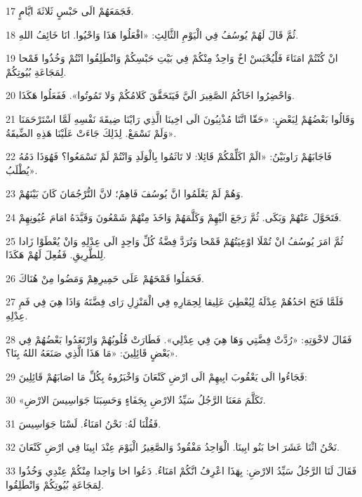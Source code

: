 \par 17 فَجَمَعَهُمْ الَى حَبْسٍ ثَلاثَةَ ايَّامٍ.
\par 18 ثُمَّ قَالَ لَهُمْ يُوسُفُ فِي الْيَوْمِ الثَّالِثِ: «افْعَلُوا هَذَا وَاحْيُوا. انَا خَائِفُ اللهِ.
\par 19 انْ كُنْتُمْ امَنَاءَ فَلْيُحْبَسْ اخٌ وَاحِدٌ مِنْكُمْ فِي بَيْتِ حَبْسِكُمْ وَانْطَلِقُوا انْتُمْ وَخُذُوا قَمْحا لِمَجَاعَةِ بُيُوتِكُمْ.
\par 20 وَاحْضِرُوا اخَاكُمُ الصَّغِيرَ الَيَّ فَيَتَحَقَّقَ كَلامُكُمْ وَلا تَمُوتُوا». فَفَعَلُوا هَكَذَا.
\par 21 وَقَالُوا بَعْضُهُمْ لِبَعْضٍ: «حَقّا انَّنَا مُذْنِبُونَ الَى اخِينَا الَّذِي رَايْنَا ضِيقَةَ نَفْسِهِ لَمَّا اسْتَرْحَمَنَا وَلَمْ نَسْمَعْ. لِذَلِكَ جَاءَتْ عَلَيْنَا هَذِهِ الضِّيقَةُ».
\par 22 فَاجَابَهُمْ رَاوبَيْنُ: «الَمْ اكَلِّمْكُمْ قَائِلا: لا تَاثَمُوا بِالْوَلَدِ وَانْتُمْ لَمْ تَسْمَعُوا؟ فَهُوَذَا دَمُهُ يُطْلَبُ».
\par 23 وَهُمْ لَمْ يَعْلَمُوا انَّ يُوسُفَ فَاهِمٌ؛ لانَّ التُّرْجُمَانَ كَانَ بَيْنَهُمْ.
\par 24 فَتَحَوَّلَ عَنْهُمْ وَبَكَى. ثُمَّ رَجَعَ الَيْهِمْ وَكَلَّمَهُمْ وَاخَذَ مِنْهُمْ شَمْعُونَ وَقَيَّدَهُ امَامَ عُيُونِهِمْ.
\par 25 ثُمَّ امَرَ يُوسُفُ انْ تُمْلَا اوْعِيَتُهُمْ قَمْحا وَتُرَدَّ فِضَّةُ كُلِّ وَاحِدٍ الَى عِدْلِهِ وَانْ يُعْطَوْا زَادا لِلطَّرِيقِ. فَفُعِلَ لَهُمْ هَكَذَا.
\par 26 فَحَمَلُوا قَمْحَهُمْ عَلَى حَمِيرِهِمْ وَمَضُوا مِنْ هُنَاكَ.
\par 27 فَلَمَّا فَتَحَ احَدُهُمْ عِدْلَهُ لِيُعْطِيَ عَلِيقا لِحِمَارِهِ فِي الْمَنْزِلِ رَاى فِضَّتَهُ وَاذَا هِيَ فِي فَمِ عِدْلِهِ.
\par 28 فَقَالَ لاخْوَتِهِ: «رُدَّتْ فِضَّتِي وَهَا هِيَ فِي عِدْلِي». فَطَارَتْ قُلُوبُهُمْ وَارْتَعَدُوا بَعْضُهُمْ فِي بَعْضٍ قَائِلِينَ: «مَا هَذَا الَّذِي صَنَعَهُ اللهُ بِنَا؟».
\par 29 فَجَاءُوا الَى يَعْقُوبَ ابِيهِمْ الَى ارْضِ كَنْعَانَ وَاخْبَرُوهُ بِكُلِّ مَا اصَابَهُمْ قَائِلِينَ:
\par 30 «تَكَلَّمَ مَعَنَا الرَّجُلُ سَيِّدُ الارْضِ بِجَفَاءٍ وَحَسِبَنَا جَوَاسِيسَ الارْضِ.
\par 31 فَقُلْنَا لَهُ: نَحْنُ امَنَاءُ. لَسْنَا جَوَاسِيسَ.
\par 32 نَحْنُ اثْنَا عَشَرَ اخا بَنُو ابِينَا. الْوَاحِدُ مَفْقُودٌ وَالصَّغِيرُ الْيَوْمَ عِنْدَ ابِينَا فِي ارْضِ كَنْعَانَ.
\par 33 فَقَالَ لَنَا الرَّجُلُ سَيِّدُ الارْضِ: بِهَذَا اعْرِفُ انَّكُمْ امَنَاءُ. دَعُوا اخا وَاحِدا مِنْكُمْ عِنْدِي وَخُذُوا لِمَجَاعَةِ بُيُوتِكُمْ وَانْطَلِقُوا.
